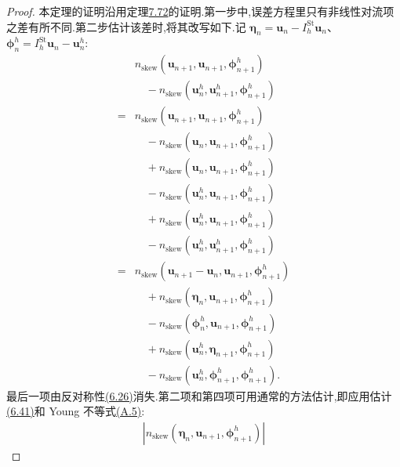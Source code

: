 \begin{proof}
本定理的证明沿用定理\hyperref[thm:fully-discrete-backward-euler-velocity-error]{7.72}的证明.第一步中,误差方程里只有非线性对流项之差有所不同.第二步估计该差时,将其改写如下.记
$\symbf{\eta}_n=\bm{u}_n-I_h^{\mathrm{St}}\bm{u}_n$、
$\symbf{\phi}_n^h=I_h^{\mathrm{St}}\bm{u}_n-\bm{u}_n^h$:
\[
\begin{aligned}
 &n_{\mathrm{skew}}(\bm{u}_{n+1},\bm{u}_{n+1},
                     \symbf{\phi}_{n+1}^h)\\
 &\quad-n_{\mathrm{skew}}(\bm{u}_n^h,\bm{u}_{n+1}^h,
                           \symbf{\phi}_{n+1}^h)\\
={}&n_{\mathrm{skew}}(\bm{u}_{n+1},\bm{u}_{n+1},
                       \symbf{\phi}_{n+1}^h)\\
 &\quad-n_{\mathrm{skew}}(\bm{u}_n,\bm{u}_{n+1},
                           \symbf{\phi}_{n+1}^h)\\
 &\quad+n_{\mathrm{skew}}(\bm{u}_n,\bm{u}_{n+1},
                           \symbf{\phi}_{n+1}^h)\\
 &\quad-n_{\mathrm{skew}}(\bm{u}_n^h,\bm{u}_{n+1},
                           \symbf{\phi}_{n+1}^h)\\
 &\quad+n_{\mathrm{skew}}(\bm{u}_n^h,\bm{u}_{n+1},
                           \symbf{\phi}_{n+1}^h)\\
 &\quad-n_{\mathrm{skew}}(\bm{u}_n^h,\bm{u}_{n+1}^h,
                           \symbf{\phi}_{n+1}^h)\\
={}&n_{\mathrm{skew}}(\bm{u}_{n+1}-\bm{u}_n,\bm{u}_{n+1},
                       \symbf{\phi}_{n+1}^h)\\
 &\quad+n_{\mathrm{skew}}(\symbf{\eta}_n,\bm{u}_{n+1},
                           \symbf{\phi}_{n+1}^h)\\
 &\quad-n_{\mathrm{skew}}(\symbf{\phi}_n^h,\bm{u}_{n+1},
                           \symbf{\phi}_{n+1}^h)\\
 &\quad+n_{\mathrm{skew}}(\bm{u}_n^h,\symbf{\eta}_{n+1},
                           \symbf{\phi}_{n+1}^h)\\
 &\quad-n_{\mathrm{skew}}(\bm{u}_n^h,\symbf{\phi}_{n+1}^h,
                           \symbf{\phi}_{n+1}^h).
\end{aligned}
\]
最后一项由反对称性\hyperref[eq:steady-ns-convection-zero-rot-skew]{(6.26)}消失.第二项和第四项可用通常的方法估计,即应用估计\hyperref[eq:steady-ns-conv-estimate-41]{(6.41)}和 Young 不等式\hyperref[eq:appendix-a-5]{(A.5)}:
\[
\begin{aligned}
 |n_{\mathrm{skew}}(\symbf{\eta}_n,\bm{u}_{n+1},
                          \symbf{\phi}_{n+1}^h)|

\end{aligned}\]
\end{proof}
